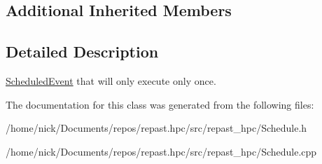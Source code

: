 \subsection*{Additional Inherited Members}


\subsection{Detailed Description}
\hyperlink{classrepast_1_1_scheduled_event}{Scheduled\-Event} that will only execute only once. 

The documentation for this class was generated from the following files\-:\begin{DoxyCompactItemize}
\item 
/home/nick/\-Documents/repos/repast.\-hpc/src/repast\-\_\-hpc/Schedule.\-h\item 
/home/nick/\-Documents/repos/repast.\-hpc/src/repast\-\_\-hpc/Schedule.\-cpp\end{DoxyCompactItemize}
